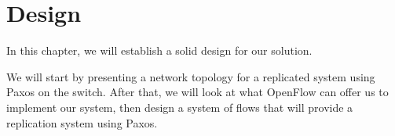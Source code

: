 \chapter{Design}
\label{chapter:design}

In this chapter, we will establish a solid design for our solution.

We will start by presenting a network topology for a replicated system using
Paxos on the switch.  After that, we will look at what OpenFlow can offer us
to implement our system, then design a system of flows that will provide a
replication system using Paxos.



